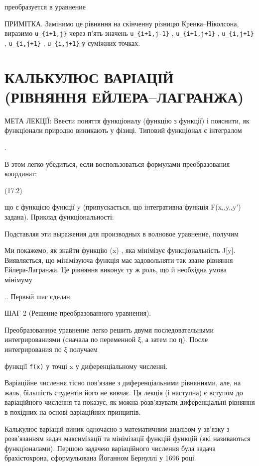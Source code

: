 \documentclass[
  ukrainian,
]{article}
\begin{document}
преобразуется в уравнение

ПРИМІТКА. Замінимо це рівняння на скінченну різницю Кренка--Ніколсона,
виразимо \texttt{u\_\{i+1,j\}} через п'ять значень
\texttt{u\_\{i+1,j-1\}} , \texttt{u\_\{i+1,j+1\}} ,
\texttt{u\_\{i,j+1\}} , \texttt{u\_\{i,j+1\}} , \texttt{u\_\{i,j+1\}} у
суміжних точках.

\section{КАЛЬКУЛЮС ВАРІАЦІЙ (РІВНЯННЯ
ЕЙЛЕРА--ЛАГРАНЖА)}\label{ux43aux430ux43bux44cux43aux443ux43bux44eux441-ux432ux430ux440ux456ux430ux446ux456ux439-ux440ux456ux432ux43dux44fux43dux43dux44f-ux435ux439ux43bux435ux440ux430ux43bux430ux433ux440ux430ux43dux436ux430}

МЕТА ЛЕКЦІЇ: Ввести поняття функціоналу (функцію з функції) і пояснити,
як функціонали природно виникають у фізиці. Типовий функціонал є
інтегралом

.

В этом легко убедиться, если воспользоваться формулами преобразования
координат:

(17.2)

що є функцією функції y (припускається, що інтегративна функція
F\left(x,,y,,y'\right) задана). Приклад функціональності:

Подставляя эти выражения для производных в волновое уравнение, получим

Ми покажемо, як знайти функцію (x) , яка мінімізує
функціональність J{[}y{]}. Виявляється, що мінімізуюча функція має
 задовольняти так зване рівняння Ейлера-Лагранжа. Це
рівняння виконує ту ж роль, що й необхідна умова мінімуму

.. Первый шаг сделан.

ШАГ 2 (Решение преобразованного уравнения).

Преобразованное уравнение легко решить двумя последовательными
интегрированиями (сначала по переменной ξ, а затем по η). После
интегрирования по ξ получаем

функції \texttt{f(x)} у точці x у диференціальному численні.

Варіаційне числення тісно пов'язане з диференціальними рівняннями, але,
на жаль, більшість студентів його не вивчає. Ця лекція (і наступна) є
вступом до варіаційного числення та показує, як можна розв'язувати
диференціальні рівняння в похідних на основі варіаційних принципів.

Калькулюс варіацій виник одночасно з математичним аналізом у зв'язку з
розв'язанням задач максимізації та мінімізації функцій функцій (які
називаються функціоналами). Першою задачею варіаційного числення була
задача брахістохрона, сформульована Йоганном Бернуллі у 1696 році.
\end{document}
